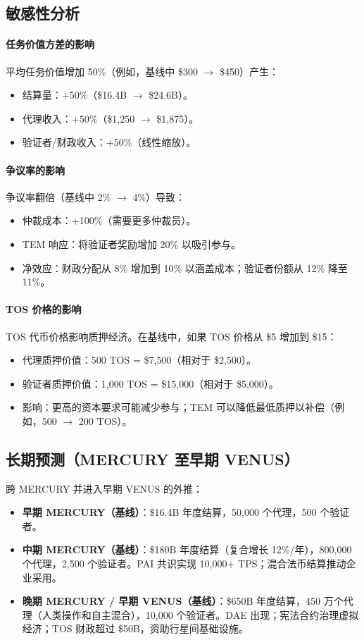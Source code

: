 \documentclass[11pt]{article}
\begin{document}
\subsection{敏感性分析}
\paragraph{任务价值方差的影响}
平均任务价值增加 50\%（例如，基线中 \$300 $\to$ \$450）产生：
\begin{itemize}[noitemsep]
  \item 结算量：+50\%（\$16.4B $\to$ \$24.6B）。
  \item 代理收入：+50\%（\$1{,}250 $\to$ \$1{,}875）。
  \item 验证者/财政收入：+50\%（线性缩放）。
\end{itemize}

\paragraph{争议率的影响}
争议率翻倍（基线中 2\% $\to$ 4\%）导致：
\begin{itemize}[noitemsep]
  \item 仲裁成本：+100\%（需要更多仲裁员）。
  \item TEM 响应：将验证者奖励增加 20\% 以吸引参与。
  \item 净效应：财政分配从 8\% 增加到 10\% 以涵盖成本；验证者份额从 12\% 降至 11\%。
\end{itemize}

\paragraph{TOS 价格的影响}
TOS 代币价格影响质押经济。在基线中，如果 TOS 价格从 \$5 增加到 \$15：
\begin{itemize}[noitemsep]
  \item 代理质押价值：500 TOS = \$7{,}500（相对于 \$2{,}500）。
  \item 验证者质押价值：1,000 TOS = \$15{,}000（相对于 \$5{,}000）。
  \item 影响：更高的资本要求可能减少参与；TEM 可以降低最低质押以补偿（例如，500 $\to$ 200 TOS）。
\end{itemize}

\subsection{长期预测（MERCURY 至早期 VENUS）}
跨 MERCURY 并进入早期 VENUS 的外推：
\begin{itemize}[noitemsep]
  \item \textbf{早期 MERCURY（基线）}：\$16.4B 年度结算，50,000 个代理，500 个验证者。
  \item \textbf{中期 MERCURY（基线）}：\$180B 年度结算（复合增长 12\%/年），800,000 个代理，2,500 个验证者。PAI 共识实现 10,000+ TPS；混合法币结算推动企业采用。
  \item \textbf{晚期 MERCURY / 早期 VENUS（基线）}：\$650B 年度结算，450 万个代理（人类操作和自主混合），10,000 个验证者。DAE 出现；宪法合约治理虚拟经济；TOS 财政超过 \$50B，资助行星间基础设施。
\end{itemize}
\end{document}
